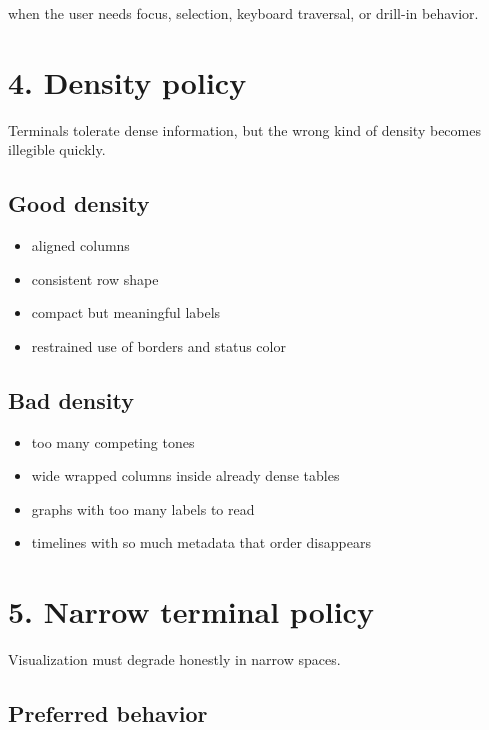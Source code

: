 when the user needs focus, selection, keyboard traversal, or drill-in behavior.

\section{4. Density policy}\label{record-020-density-policy}

Terminals tolerate dense information, but the wrong kind of density becomes illegible quickly.

\subsection{Good density}\label{record-020-good-density}

\begin{itemize}
\tightlist
\item
  aligned columns
\item
  consistent row shape
\item
  compact but meaningful labels
\item
  restrained use of borders and status color
\end{itemize}

\subsection{Bad density}\label{record-020-bad-density}

\begin{itemize}
\tightlist
\item
  too many competing tones
\item
  wide wrapped columns inside already dense tables
\item
  graphs with too many labels to read
\item
  timelines with so much metadata that order disappears
\end{itemize}

\section{5. Narrow terminal policy}\label{record-020-narrow-terminal-policy}

Visualization must degrade honestly in narrow spaces.

\subsection{Preferred behavior}\label{record-020-preferred-behavior}

